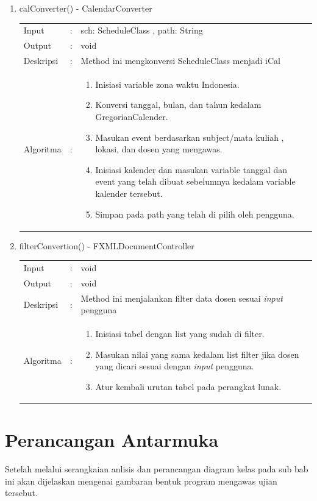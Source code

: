 \begin{enumerate}
	\item calConverter() - CalendarConverter\\
	\begin{tabular}{l c p{9cm}}
		Input & : & sch: ScheduleClass , path: String\\ 
		Output & : & void \\ 
		Deskripsi & : & Method ini mengkonversi ScheduleClass menjadi iCal\\
		Algoritma & : & 
			\begin{enumerate}
				\item Inisiasi variable zona waktu Indonesia.
				\item Konversi tanggal, bulan, dan tahun kedalam GregorianCalender.
				\item Masukan event berdasarkan subject/mata kuliah , lokasi, dan dosen yang mengawas.
				\item Inisiasi kalender dan masukan variable tanggal dan event yang telah dibuat sebelumnya kedalam variable kalender tersebut.
				\item Simpan pada path yang telah di pilih oleh pengguna.
			\end{enumerate}
		\end{tabular}	
		
	\item filterConvertion() - FXMLDocumentController\\
	\begin{tabular}{l c p{9cm}}
		Input & : & void\\ 
		Output & : & void \\ 
		Deskripsi & : & Method ini menjalankan filter data dosen sesuai \textit{input} pengguna\\
		Algoritma & : & 
			\begin{enumerate}
				\item Inisiasi tabel dengan list yang sudah di filter.
				\item Masukan nilai yang sama kedalam list filter jika dosen yang dicari sesuai dengan \textit{input} pengguna.
				\item Atur kembali urutan tabel pada perangkat lunak.
			\end{enumerate}
		\end{tabular}	
\end{enumerate}


\section{Perancangan Antarmuka}
Setelah melalui serangkaian anlisis dan perancangan diagram kelas pada sub bab ini akan dijelaskan mengenai gambaran bentuk program mengawas ujian tersebut.


